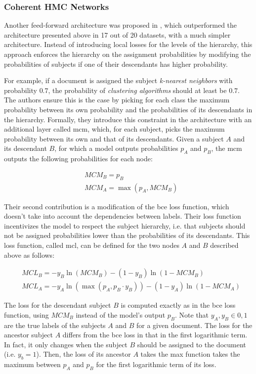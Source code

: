 \subsubsection{Coherent HMC Networks}

Another feed-forward architecture was proposed in \cite{giunchiglia2020coherent}, which outperformed the architecture presented above in 17 out of 20 datasets, with a much simpler architecture. Instead of introducing local losses for the levels of the hierarchy, this approach enforces the hierarchy on the assignment probabilities by modifying the probabilities of subjects if one of their descendants has higher probability.

For example, if a document is assigned the subject \textit{k-nearest neighbors} with probability $0.7$, the probability of \textit{clustering algorithms} should at least be $0.7$. The authors ensure this is the case by picking for each class the maximum probability between its own probability and the probabilities of its descendants in the hierarchy. Formally, they introduce this constraint in the architecture with an additional layer called \acrfull{mcm}, which, for each subject, picks the maximum probability between its own and that of its descendants. Given a subject $A$ and its descendant $B$, for which a model outputs probabilities $p_A$ and $p_B$, the \acrshort{mcm} outputs the following probabilities for each node:

\begin{align*} 
    & MCM_B = p_B \\ 
    & MCM_A = \max(p_A, MCM_B)
\end{align*}

Their second contribution is a modification of the \acrfull{bce} loss function, which doesn't take into account the dependencies between labels. Their loss function incentivizes the model to respect the subject hierarchy, i.e. that subjects should not be assigned probabilities lower than the probabilities of its descendants. This loss function, called \acrfull{mcl}, can be defined for the two nodes $A$ and $B$ described above as follows:

\begin{align*} 
    & MCL_B = -y_B \ln(MCM_B) - (1 - y_B) \ln(1 - MCM_B) \\ 
    & MCL_A = -y_A \ln(\max(p_A, p_B \cdot y_B)) - (1 - y_A) \ln(1 - MCM_A)
\end{align*}

The loss for the descendant subject $B$ is computed exactly as in the \acrshort{bce} loss function, using $MCM_B$ instead of the model's output $p_B$. Note that $y_A, y_B \in {0, 1}$ are the true labels of the subjects $A$ and $B$ for a given document. The loss for the ancestor subject $A$ differs from the \acrshort{bce} loss in that in the first logarithmic term. In fact, it only changes when the subject $B$ should be assigned to the document (i.e. $y_b = 1$). Then, the loss of its ancestor $A$ takes the max function takes the maximum between $p_A$ and $p_B$ for the first logarithmic term of its loss.

